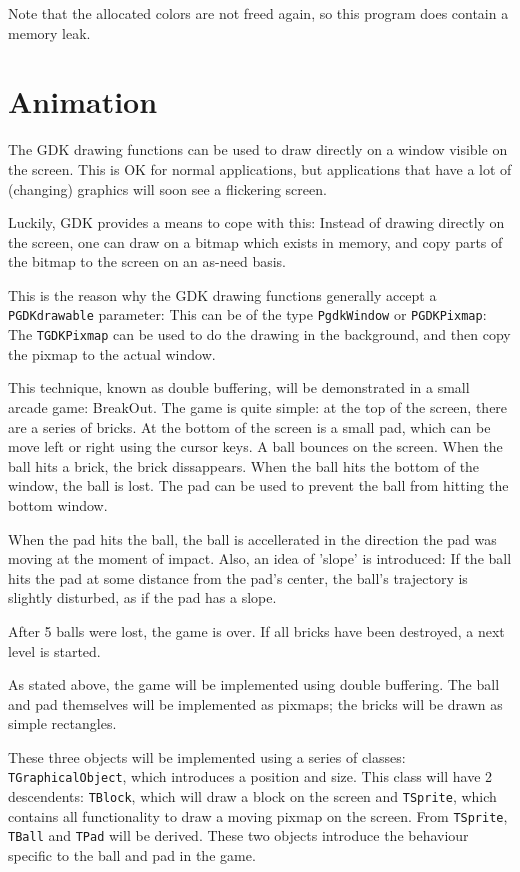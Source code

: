 \documentclass[10pt]{article}
\newcommand{\var}[1]{\texttt{#1}}
\begin{document}
Note that the allocated colors are not freed again, so this program does
contain a memory leak.

\section{Animation}
The GDK drawing functions can be used to draw directly on a window visible
on the screen. This is OK for normal applications, but applications that
have a lot of (changing) graphics will soon see a flickering screen. 

Luckily, GDK provides a means to cope with this: Instead of drawing directly
on the screen, one can draw on a bitmap which exists in memory, and copy
parts of the bitmap to the screen on an as-need basis.

This is the reason why the GDK drawing functions generally accept a
\var{PGDKdrawable} parameter: This can be of the type \var{PgdkWindow} or
\var{PGDKPixmap}: The \var{TGDKPixmap} can be used to do the drawing in the
background, and then copy the pixmap to the actual window. 

This technique, known as double buffering, will be demonstrated in a small
arcade game: BreakOut. The game is quite simple: at the top of the screen,
there are a series of bricks. At the bottom of the screen is a small pad,
which can be move left or right using the cursor keys. A ball bounces on the
screen. When the ball hits a brick, the brick dissappears. When the ball
hits the bottom of the window, the ball is lost. The pad can be used to
prevent the ball from hitting the bottom window.

When the pad hits the ball, the ball is accellerated in the direction the
pad was moving at the moment of impact. Also, an idea of 'slope' is
introduced: If the ball hits the pad at some distance from the pad's center,
the ball's trajectory is slightly disturbed, as if the pad has a slope.

After 5 balls were lost, the game is over. If all bricks have been
destroyed, a next level is started.

As stated above, the game will be implemented using double buffering.
The ball and pad themselves will be implemented as pixmaps; the bricks
will be drawn as simple rectangles.

These three objects will be implemented using a series of classes:
\var{TGraphicalObject}, which introduces a position and size. This class
will have 2 descendents: \var{TBlock}, which will draw a block on the
screen and \var{TSprite}, which contains all functionality to draw a moving
pixmap on the screen. From \var{TSprite}, \var{TBall} and \var{TPad} will be
derived. These two objects introduce the behaviour specific to the ball and
pad in the game.
\end{document}
